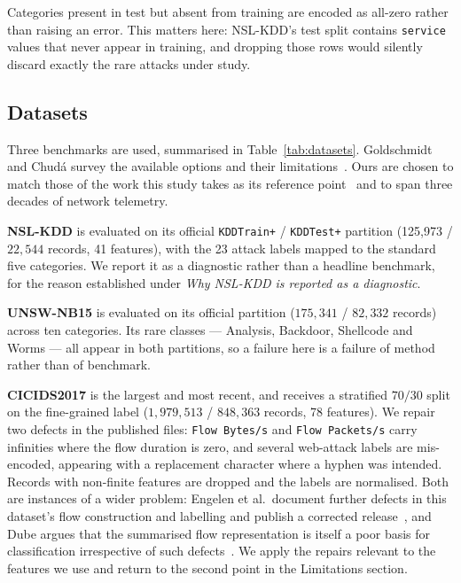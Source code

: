 \documentclass[11pt]{article}
\newcommand{\trainRows}{125{,}973}
\begin{document}
Categories present in test but absent from training are encoded as all-zero rather
than raising an error. This matters here: NSL-KDD's test split contains
\texttt{service} values that never appear in training, and dropping those rows would
silently discard exactly the rare attacks under study.


\subsection*{Datasets}

Three benchmarks are used, summarised in Table~\ref{tab:datasets}. Goldschmidt and Chud\'{a} survey the available options and their limitations~\cite{goldschmidt2025network}. Ours are chosen to
match those of the work this study takes as its
reference point~\cite{alsubaei2025smart} and to span three decades of network
telemetry.

\textbf{NSL-KDD} is evaluated on its official \texttt{KDDTrain+} /
\texttt{KDDTest+} partition (\trainRows{} / $22{,}544$ records, 41 features), with
the 23 attack labels mapped to the standard five categories. We report it as a
diagnostic rather than a headline benchmark, for the reason established under \emph{Why NSL-KDD is reported as a diagnostic}.

\textbf{UNSW-NB15} is evaluated on its official partition ($175{,}341$ /
$82{,}332$ records) across ten categories. Its rare classes --- Analysis, Backdoor,
Shellcode and Worms --- all appear in both partitions, so a failure here is a failure
of method rather than of benchmark.

\textbf{CICIDS2017} is the largest and most recent, and receives a stratified
$70/30$ split on the fine-grained label ($1{,}979{,}513$ / $848{,}363$ records, 78
features). We repair two defects in the published files: \texttt{Flow Bytes/s} and
\texttt{Flow Packets/s} carry infinities where the flow duration is zero, and
several web-attack labels are mis-encoded, appearing with a replacement character
where a hyphen was intended. Records with non-finite features are dropped and the labels are normalised. Both are instances of a wider problem: Engelen et al.\ document further defects in this dataset's flow construction and labelling and publish a corrected release~\cite{engelen2021troubleshooting}, and Dube argues that the summarised flow representation is itself a poor basis for classification irrespective of such defects~\cite{dube2024faulty}. We apply the repairs relevant to the features we use and return to the second point in the Limitations section.
\end{document}
